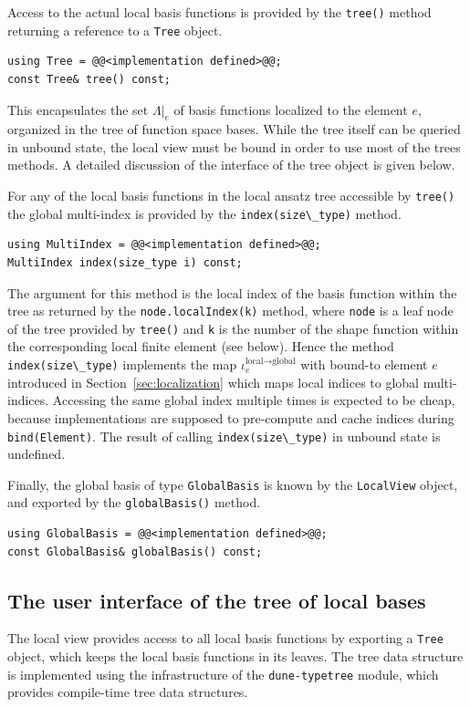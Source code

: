\documentclass[a4paper,10pt,headings=normal,bibliography=totoc]{scrartcl}
\newcommand{\cpp}[1]{\lstinline[basicstyle=\ttfamily]!#1!}
\newcommand{\dunemodule}[1]{\texttt{#1}}
\begin{document}
Access to the actual local basis functions is provided
by the \cpp{tree()} method returning a reference to a
\cpp{Tree} object.
\begin{lstlisting}[style=Interface]
using Tree = @@<implementation defined>@@;
const Tree& tree() const;
\end{lstlisting}
This encapsulates the set $\Lambda|_e$ of basis functions localized to the
element $e$, organized in the tree of function space bases.
While the tree  itself can be queried in unbound state,
the local view must be bound in order to use most of the
trees methods.
A detailed discussion of the interface of the tree object is
given below.

For any of the local basis functions in the local ansatz tree
accessible by \cpp{tree()} the global multi-index
is provided by the \cpp{index(size\_type)} method.
\begin{lstlisting}[style=Interface]
using MultiIndex = @@<implementation defined>@@;
MultiIndex index(size_type i) const;
\end{lstlisting}
The argument for this method is the local
index of the basis function within the tree as
returned by the \cpp{node.localIndex(k)}
method, where \cpp{node} is a leaf node of the
tree provided by \cpp{tree()} and \cpp{k}
is the number of the shape function within the corresponding
local finite element (see below).
Hence the method \cpp{index(size\_type)}
implements the map $\iota^{\text{local}\to\text{global}}_e$
with bound-to element $e$
introduced in Section~\ref{sec:localization}
which maps local indices to global multi-indices.
Accessing the same global index multiple times
is expected to be cheap, because implementations are supposed to pre-compute
and cache indices during \cpp{bind(Element)}.
The result of calling \cpp{index(size\_type)} in
unbound state is undefined.

Finally, the global basis of type \cpp{GlobalBasis}
is known by the \cpp{LocalView} object, and exported by the \cpp{globalBasis()} method.
\begin{lstlisting}[style=Interface]
using GlobalBasis = @@<implementation defined>@@;
const GlobalBasis& globalBasis() const;
\end{lstlisting}



\subsection{The user interface of the tree of local bases}
The local view provides access to all local basis functions
by exporting a \cpp{Tree} object, which keeps the local basis functions in its leaves.
The tree data structure is implemented using the infrastructure of the \dunemodule{dune-typetree}
module, which provides compile-time tree data structures.
\end{document}
